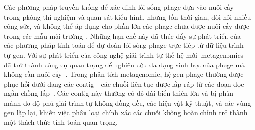 Các phương pháp truyền thống để xác định lối sống phage dựa vào nuôi cấy trong phòng thí nghiệm và quan sát kiểu hình, nhưng tốn thời gian, đòi hỏi nhiều công sức, và không thể áp dụng cho phần lớn các phage chưa được nuôi cấy được trong các mẫu môi trường~\cite{shang2023phatyp}. Những hạn chế này đã thúc đẩy sự phát triển của các phương pháp tính toán để dự đoán lối sống phage trực tiếp từ dữ liệu trình tự gen. Với sự phát triển của công nghệ giải trình tự thế hệ mới, metagenomics đã trở thành công cụ quan trọng để nghiên cứu đa dạng sinh học của phage mà không cần nuôi cấy~\cite{mokili2012metagenomics,hayes2017metagenomic}. Trong phân tích metagenomic, hệ gen phage thường được phục hồi dưới dạng các contig—các chuỗi liên tục được lắp ráp từ các đoạn đọc ngắn chồng lấp~\cite{setubal2021metagenome,ghurye2016metagenomic}. Các contig này thường có độ dài biến thiên lớn và bị phân mảnh do độ phủ giải trình tự không đồng đều, các hiện vật kỹ thuật, và các vùng gen lặp lại, khiến việc phân loại chính xác các chuỗi không hoàn chỉnh trở thành một thách thức tính toán quan trọng.
